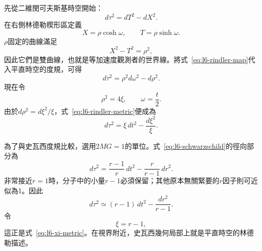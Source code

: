 先從二維閔可夫斯基時空開始：
\begin{equation}
d\tau^{2}=dT^{2}-dX^{2}.
\end{equation}
在右側林德勒楔形區定義
\begin{equation}
X=\rho\cosh\omega,
\qquad
T=\rho\sinh\omega.
\label{eq:l6-rindler-map}
\end{equation}
\(\rho\)固定的曲線滿足
\begin{equation}
X^{2}-T^{2}=\rho^{2},
\end{equation}
因此它們是雙曲線，也就是等加速度觀測者的世界線。將式~\eqref{eq:l6-rindler-map}代入平直時空的度規，可得
\begin{equation}
d\tau^{2}
=\rho^{2}d\omega^{2}-d\rho^{2}.
\label{eq:l6-rindler-metric}
\end{equation}
現在令
\begin{equation}
\rho^{2}=4\xi,
\qquad
\omega=\frac{t}{2}.
\label{eq:l6-rindler-rescale}
\end{equation}
由於\(d\rho^{2}=d\xi^{2}/\xi\)，式~\eqref{eq:l6-rindler-metric}便成為
\begin{equation}
d\tau^{2}
=\xi\,dt^{2}-\frac{d\xi^{2}}{\xi}.
\label{eq:l6-xi-metric}
\end{equation}

\begin{classroomqa}
\end{classroomqa}

為了與史瓦西度規比較，選用\(2MG=1\)的單位。式~\eqref{eq:l6-schwarzschild}的徑向部分為
\begin{equation}
d\tau^{2}
=
\frac{r-1}{r}\,dt^{2}
-
\frac{r}{r-1}\,dr^{2}.
\end{equation}
非常接近\(r=1\)時，分子中的小量\(r-1\)必須保留；其他原本無關緊要的\(r\)因子則可近似為1。因此
\begin{equation}
d\tau^{2}
\simeq
(r-1)\,dt^{2}
-
\frac{dr^{2}}{r-1}.
\end{equation}
令
\begin{equation}
\xi=r-1,
\end{equation}
這正是式~\eqref{eq:l6-xi-metric}。在視界附近，史瓦西幾何局部上就是平直時空的林德勒描述。

\begin{classroomqa}
\end{classroomqa}

